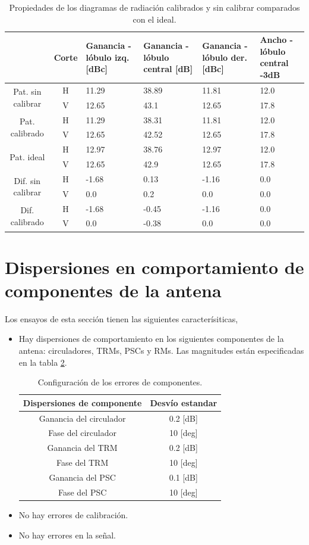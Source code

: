 \begin{table}[H]
  \footnotesize
  \centering
  \begin{tabular}{|c|c|p{2cm}|p{2.5cm}|p{2.5cm}|p{2.5cm}|}
    \cline{2-6}
    \multicolumn{1}{c|}{} & Corte & Ganancia - lóbulo izq. [dBc] & Ganancia - lóbulo central [dB] &
    Ganancia - lóbulo der. [dBc] & Ancho - lóbulo central -3dB \tabularnewline\hline
    \multirow{2}{2cm}{Pat. sin calibrar} & H & 11.29 & 38.89 & 11.81 & 12.0 \tabularnewline\cline{2-6}
     & V & 12.65 & 43.1 & 12.65 & 17.8 \tabularnewline\hline
    \multirow{2}{2cm}{Pat. calibrado} & H & 11.29 & 38.31 & 11.81 & 12.0 \tabularnewline\cline{2-6}
     & V & 12.65 & 42.52 & 12.65 & 17.8 \tabularnewline\hline
    \multirow{2}{2cm}{Pat. ideal} & H & 12.97 & 38.76 & 12.97 & 12.0 \tabularnewline\cline{2-6}
     & V & 12.65 & 42.9 & 12.65 & 17.8 \tabularnewline\hline
    \multirow{2}{2cm}{Dif. sin calibrar} & H & -1.68 & 0.13 & -1.16 & 0.0\tabularnewline\cline{2-6}
     & V & 0.0 & 0.2 & 0.0 & 0.0 \tabularnewline\hline
    \multirow{2}{2cm}{Dif. calibrado} & H & -1.68 & -0.45 & -1.16 & 0.0 \tabularnewline\cline{2-6}
     & V & 0.0 & -0.38 & 0.0 & 0.0 \tabularnewline\hline
  \end{tabular}
  \caption{Propiedades de los diagramas de radiación calibrados y sin calibrar comparados con el ideal.}
  \label{tab:deadTRMsMutual10degRow}
\end{table}


\section{Dispersiones en comportamiento de componentes de la antena}

Los ensayos de esta sección tienen las siguientes caracterísiticas,
\begin{itemize}
	\item Hay dispersiones de comportamiento en los siguientes componentes de la antena: circuladores, TRMs, PSCs y RMs. Las 
		magnitudes están especificadas en la tabla \ref{tab:errorReferences}.
		\begin{table}[H]
		  \footnotesize
		  \centering
		  \begin{tabular}{|c|c|}
			\hline
			\textbf{Dispersiones de componente} & \textbf{Desvío estandar} \tabularnewline \hline 
			Ganancia del circulador &  0.2 [dB] \tabularnewline\hline 
			Fase del circulador &  10 [deg] \tabularnewline\hline 
			Ganancia del TRM &  0.2 [dB] \tabularnewline\hline 
			Fase del TRM &  10 [deg] \tabularnewline\hline 
			Ganancia del PSC &  0.1 [dB] \tabularnewline\hline 
			Fase del PSC &  10 [deg] \tabularnewline\hline 
		  \end{tabular}
		  \caption{Configuración de los errores de componentes.}
		  \label{tab:errorReferences}
		\end{table}
	\item No hay errores de calibración.
	\item No hay errores en la señal.
\end{itemize}

